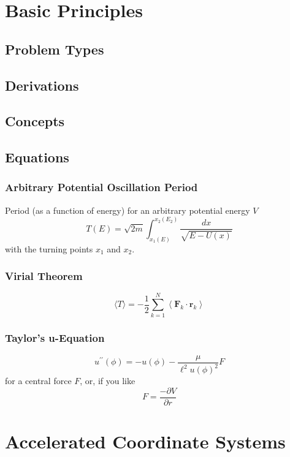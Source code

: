 \documentclass[25pt]{book}
\begin{document}
	
	\tableofcontents
	
	\chapter{Basic Principles}
	
	\section{Problem Types}
	
	\section{Derivations}
	
	\section{Concepts}
	
	\section{Equations}
	
	\subsection{Arbitrary Potential Oscillation Period}
	
	Period (as a function of energy) for an arbitrary potential energy $V$
	\[
	T(E)=\sqrt{2 m} \int_{x_{1}(E)}^{x_2\left(E_{2}\right)} \frac{d x}{\sqrt{E-U(x)}}
	\]
	with the turning points $x_1$ and $x_2$. 
	
	\subsection{Virial Theorem}
	
	\[
	\langle T\rangle=-\frac{1}{2} \sum_{k=1}^{N}\left\langle\mathbf{F}_{k} \cdot \mathbf{r}_{k}\right\rangle
	\]
	
	\subsection{Taylor's u-Equation}
	
	\[
	u^{\prime \prime}(\phi)=-u(\phi)-\frac{\mu}{\ell^{2} u(\phi)^{2}} F
	\]
	for a central force $F$, or, if you like
	\[
	F = \frac{-\partial V}{\partial r}
	\]
	
	\chapter{Accelerated Coordinate Systems}
	
\end{document}
